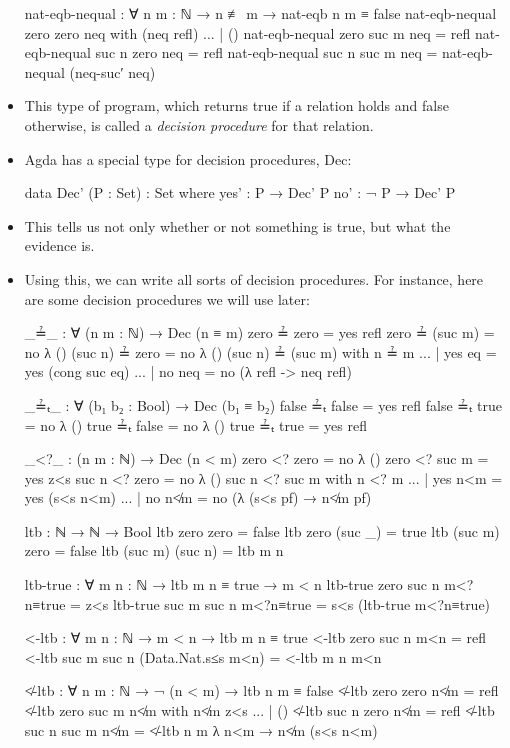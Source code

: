 \documentclass{lecturenotes}
\begin{document}
\begin{itemize}
\begin{code}
nat-eqb-nequal : ∀ {n m : ℕ} → n ≢ m → nat-eqb n m ≡ false
nat-eqb-nequal {zero} {zero} neq with (neq refl)
... | () 
nat-eqb-nequal {zero} {suc m} neq = refl
nat-eqb-nequal {suc n} {zero} neq = refl
nat-eqb-nequal {suc n} {suc m} neq = nat-eqb-nequal (neq-suc′ neq)
\end{code}
\item This type of program, which returns \textsf{true} if a relation holds and false otherwise, is called a \emph{decision procedure} for that relation.
\item Agda has a special type for decision procedures, \textsf{Dec}:
\begin{code}
data Dec' (P : Set) : Set where
  yes' : P   → Dec' P
  no'  : ¬ P → Dec' P
\end{code}
\item This tells us not only whether or not something is true, but what the evidence is.
\item Using this, we can write all sorts of decision procedures.
  For instance, here are some decision procedures we will use later:
\begin{code}
_≟_ : ∀ (n m : ℕ) → Dec (n ≡ m)
zero ≟ zero = yes refl
zero ≟ (suc m) = no λ ()
(suc n) ≟ zero = no λ ()
(suc n) ≟ (suc m) with n ≟ m
... | yes eq  = yes (cong suc eq)
... | no neq = no (λ {refl -> neq refl}) 

_≟ₜ_ : ∀ (b₁ b₂ : Bool) → Dec (b₁ ≡ b₂)
false ≟ₜ false = yes refl
false ≟ₜ true = no λ ()
true ≟ₜ false = no λ ()
true ≟ₜ true = yes refl

_<?_ : (n m : ℕ) → Dec (n < m)
zero <? zero = no λ ()
zero <? suc m = yes z<s
suc n <? zero = no λ ()
suc n <? suc m with n <? m
... | yes n<m = yes (s<s n<m)
... | no n≮m = no (λ {(s<s pf) → n≮m pf}) 

ltb : ℕ → ℕ → Bool
ltb zero zero = false
ltb zero (suc _) = true
ltb (suc m) zero = false
ltb (suc m) (suc n) = ltb m n

ltb-true : ∀ {m n : ℕ} → ltb m n ≡ true → m < n
ltb-true {zero} {suc n} m<?n≡true = z<s
ltb-true {suc m} {suc n} m<?n≡true = s<s (ltb-true m<?n≡true)

<-ltb : ∀ {m n : ℕ} → m < n → ltb m n ≡ true
<-ltb {zero} {suc n} m<n = refl
<-ltb {suc m} {suc n} (Data.Nat.s≤s m<n) = <-ltb {m} {n} m<n

≮-ltb : ∀ {n m : ℕ} → ¬ (n < m) → ltb n m ≡ false
≮-ltb {zero} {zero} n≮m = refl
≮-ltb {zero} {suc m} n≮m with n≮m z<s
... | ()
≮-ltb {suc n} {zero} n≮m = refl
≮-ltb {suc n} {suc m} n≮m = ≮-ltb {n} {m} λ n<m → n≮m (s<s n<m)
\end{code}
\end{itemize}
\end{document}

